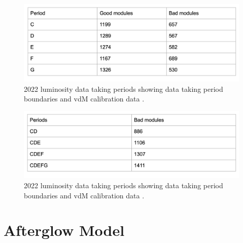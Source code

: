 \begin{figure}[!htp]
\centering
\includegraphics[width=1\textwidth]{ashish_thesis/2022_per_period_veto.png}
\caption[2018 CMS luminosity data taking periods.]{%
  2022 luminosity data taking periods showing data taking period boundaries and vdM calibration data  \cite{CERNLumiPublicResults}.
}
\label{fig:period_bound}
\end{figure}








\begin{figure}[!htp]
\centering
\includegraphics[width=1\textwidth]{ashish_thesis/2022_common_veto.png}
\caption[2018 CMS luminosity data taking periods.]{%
  2022 luminosity data taking periods showing data taking period boundaries and vdM calibration data  \cite{CERNLumiPublicResults}.
}
\label{fig:period_bound}
\end{figure}




\section{Afterglow Model}




